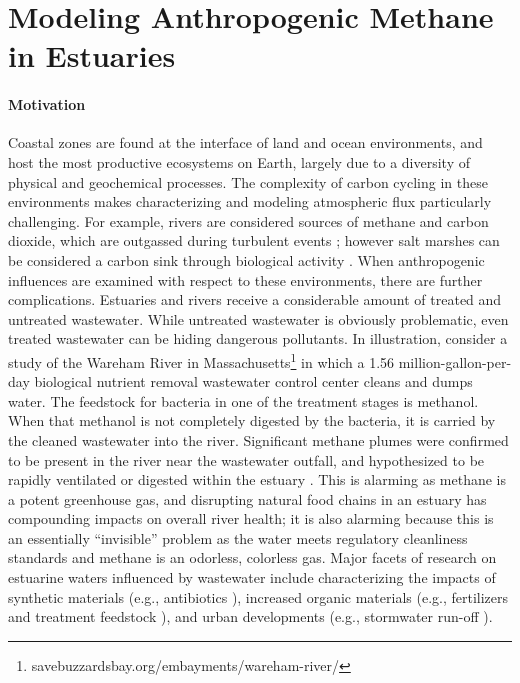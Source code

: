 \section{Modeling Anthropogenic Methane in Estuaries}
\paragraph{Motivation}
Coastal zones are found at the interface of land and ocean environments, and host the most productive ecosystems on Earth, largely due to a diversity of physical and geochemical processes.
The complexity of carbon cycling in these environments makes characterizing and modeling atmospheric flux particularly challenging.
For example, rivers are considered sources of methane and carbon dioxide, which are outgassed during turbulent events \autocite{cole2007plumbing, stanley2016ecology}; however salt marshes can be considered a carbon sink through biological activity \autocite{cai2011estuarine}.
When anthropogenic influences are examined with respect to these environments, there are further complications.
Estuaries and rivers receive a considerable amount of treated and untreated wastewater.
While untreated wastewater is obviously problematic, even treated wastewater can be hiding dangerous pollutants.
In illustration, consider a study of the Wareham River in Massachusetts\footnote{savebuzzardsbay.org/embayments/wareham-river/} in which a 1.56 million-gallon-per-day biological nutrient removal wastewater control center cleans and dumps water.
The feedstock for bacteria in one of the treatment stages is methanol. When that methanol is not completely digested by the bacteria, it is carried by the cleaned wastewater into the river. Significant methane plumes were confirmed to be present in the river near the wastewater outfall, and hypothesized to be rapidly ventilated or digested within the estuary \autocite{preston2019adaptive}.
This is alarming as methane is a potent greenhouse gas, and disrupting natural food chains in an estuary has compounding impacts on overall river health; it is also alarming because this is an essentially ``invisible'' problem as the water meets regulatory cleanliness standards and methane is an odorless, colorless gas.
Major facets of research on estuarine waters influenced by wastewater include characterizing the impacts of synthetic materials (e.g., antibiotics \autocite{roberts2006occurrence}), increased organic materials (e.g., fertilizers and treatment feedstock \autocite{valiela2016eutrophication}), and urban developments (e.g., stormwater run-off \autocite{geedicke2018urban}).


